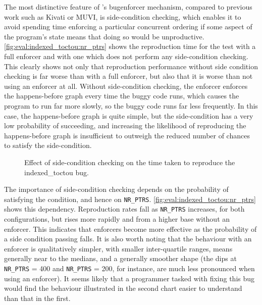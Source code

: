 The most distinctive feature of {\technique}'s \gls{bugenforcer}
mechanism, compared to previous work such as Kivati\cite{Chew2010} or
MUVI\cite{Lu2007}, is side-condition checking, which enables it to
avoid spending time enforcing a particular concurrent ordering if some
aspect of the program's state means that doing so would be
unproductive.  \autoref{fig:eval:indexed_toctou:nr_ptrs} shows the
reproduction time for the  test with a full enforcer
and with one which does not perform any side-condition checking.  This
clearly shows not only that reproduction performance without side
condition checking is far worse than with a full enforcer, but also
that it is worse than not using an enforcer at all.  Without
side-condition checking, the enforcer enforces the happens-before
graph every time the buggy code runs, which causes the program to run
far more slowly, so the buggy code runs far less frequently.  In this
case, the happens-before graph is quite simple, but the side-condition
has a very low probability of succeeding, and increasing the
likelihood of reproducing the happens-before graph is insufficient to
outweigh the reduced number of chances to satisfy the
side-condition.

\begin{figure}
  \caption{Effect of side-condition checking on the time taken to
    reproduce the indexed\_toctou bug.}
  \label{fig:eval:indexed_toctou:no_scs}
\end{figure}

The importance of side-condition checking depends on the probability
of satisfying the condition, and hence on \texttt{NR\_PTRS}.
\autoref{fig:eval:indexed_toctou:nr_ptrs} shows this dependency.
Reproduction rates fall as \texttt{NR\_PTRS} increases, for both
configurations, but rises more rapidly and from a higher base without
an enforcer.  This indicates that {\technique} enforcers become more
effective as the probability of a side condition passing falls.  It is
also worth noting that the behaviour with an enforcer is qualitatively
simpler, with smaller inter-quartile ranges, means generally near to
the medians, and a generally smoother shape (the dips at
\texttt{NR\_PTRS} = 400 and \texttt{NR\_PTRS} = 200, for instance, are
much less pronounced when using an enforcer).  It seems likely that a
programmer tasked with fixing this bug would find the behaviour
illustrated in the second chart easier to understand than that in the
first.

